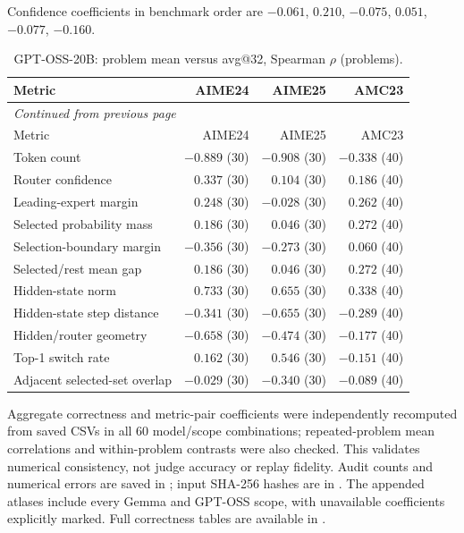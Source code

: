 Confidence coefficients in benchmark order are $-0.061$, $0.210$, $-0.075$, $0.051$, $-0.077$, $-0.160$.
\begingroup\scriptsize\setlength{\tabcolsep}{4pt}
\begin{longtable}{@{}lrrr@{}}
\caption{GPT-OSS-20B: problem mean versus avg@32, Spearman $\rho$ (problems).}\label{tab:multi-repeated-gptoss}\\
\toprule
Metric & AIME24 & AIME25 & AMC23 \\
\midrule\endfirsthead
\multicolumn{4}{l}{\textit{Continued from previous page}}\\
\toprule
Metric & AIME24 & AIME25 & AMC23 \\
\midrule\endhead
\bottomrule\endfoot
Token count & $-0.889$ (30) & $-0.908$ (30) & $-0.338$ (40) \\
Router confidence & $0.337$ (30) & $0.104$ (30) & $0.186$ (40) \\
Leading-expert margin & $0.248$ (30) & $-0.028$ (30) & $0.262$ (40) \\
Selected probability mass & $0.186$ (30) & $0.046$ (30) & $0.272$ (40) \\
Selection-boundary margin & $-0.356$ (30) & $-0.273$ (30) & $0.060$ (40) \\
Selected/rest mean gap & $0.186$ (30) & $0.046$ (30) & $0.272$ (40) \\
Hidden-state norm & $0.733$ (30) & $0.655$ (30) & $0.338$ (40) \\
Hidden-state step distance & $-0.341$ (30) & $-0.655$ (30) & $-0.289$ (40) \\
Hidden/router geometry & $-0.658$ (30) & $-0.474$ (30) & $-0.177$ (40) \\
Top-1 switch rate & $0.162$ (30) & $0.546$ (30) & $-0.151$ (40) \\
Adjacent selected-set overlap & $-0.029$ (30) & $-0.340$ (30) & $-0.089$ (40) \\
\end{longtable}\endgroup

Aggregate correctness and metric-pair coefficients were independently recomputed from saved CSVs in all 60 model/scope combinations; repeated-problem mean correlations and within-problem contrasts were also checked. This validates numerical consistency, not judge accuracy or replay fidelity. Audit counts and numerical errors are saved in ; input SHA-256 hashes are in . The appended atlases include every Gemma and GPT-OSS scope, with unavailable coefficients explicitly marked. Full correctness tables are available in .


